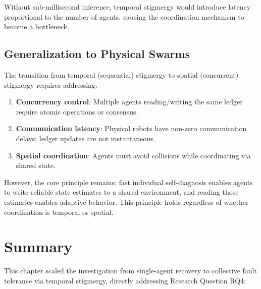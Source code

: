 ﻿\documentclass[12pt,a4paper,oneside]{report}
\begin{document}
Without sub-millisecond inference, temporal stigmergy would introduce latency proportional to the number of agents, causing the coordination mechanism to become a bottleneck.

\subsection{Generalization to Physical Swarms}

The transition from temporal (sequential) stigmergy to spatial (concurrent) stigmergy requires addressing:
\begin{enumerate}
    \item \textbf{Concurrency control}: Multiple agents reading/writing the same ledger require atomic operations or consensus.
    \item \textbf{Communication latency}: Physical robots have non-zero communication delays; ledger updates are not instantaneous.
    \item \textbf{Spatial coordination}: Agents must avoid collisions while coordinating via shared state.
\end{enumerate}

However, the core principle remains: fast individual self-diagnosis enables agents to write reliable state estimates to a shared environment, and reading those estimates enables adaptive behavior. This principle holds regardless of whether coordination is temporal or spatial.

\section{Summary}

This chapter scaled the investigation from single-agent recovery to collective fault tolerance via temporal stigmergy, directly addressing Research Question RQ4:
\end{document}
